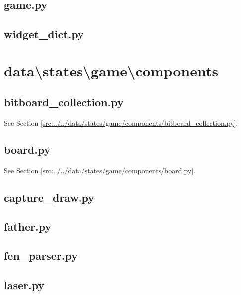 \documentclass[../main/main.tex]{subfiles}
\begin{document}
\subsection{game.py}

\label{src:data/states/game/game.py}

\subsection{widget\_dict.py}

\label{src:data/states/game/widget_dict.py}

\section{data\textbackslash states\textbackslash game\textbackslash components}
\subsection{bitboard\_collection.py}
See Section \ref{src:../../data/states/game/components/bitboard_collection.py}.

\subsection{board.py}
See Section \ref{src:../../data/states/game/components/board.py}.

\subsection{capture\_draw.py}

\label{src:data/states/game/components/capture_draw.py}

\subsection{father.py}

\label{src:data/states/game/components/father.py}

\subsection{fen\_parser.py}

\label{src:data/states/game/components/fen_parser.py}

\subsection{laser.py}

\label{src:data/states/game/components/laser.py}
\end{document}
